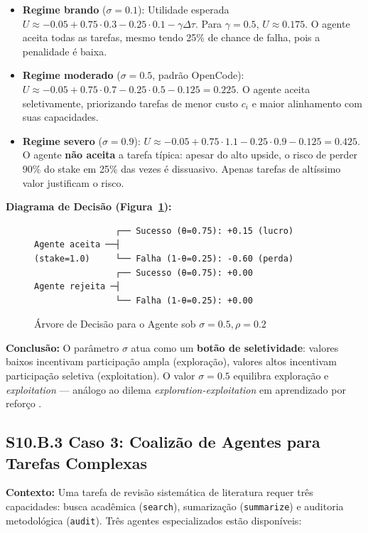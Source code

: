 \begin{itemize}
    \item \textbf{Regime brando} ($\sigma = 0.1$): Utilidade esperada $U \approx -0.05 + 0.75 \cdot 0.3 - 0.25 \cdot 0.1 - \gamma\Delta\tau$. Para $\gamma=0.5$, $U \approx 0.175$. O agente aceita todas as tarefas, mesmo tendo 25\% de chance de falha, pois a penalidade é baixa.
    
    \item \textbf{Regime moderado} ($\sigma = 0.5$, padrão OpenCode): $U \approx -0.05 + 0.75 \cdot 0.7 - 0.25 \cdot 0.5 - 0.125 = 0.225$. O agente aceita seletivamente, priorizando tarefas de menor custo $c_i$ e maior alinhamento com suas capacidades.
    
    \item \textbf{Regime severo} ($\sigma = 0.9$): $U \approx -0.05 + 0.75 \cdot 1.1 - 0.25 \cdot 0.9 - 0.125 = 0.425$. O agente \textbf{não aceita} a tarefa típica: apesar do alto upside, o risco de perder 90\% do stake em 25\% das vezes é dissuasivo. Apenas tarefas de altíssimo valor justificam o risco.
\end{itemize}

\textbf{Diagrama de Decisão (Figura~\ref{fig:decision_tree}):}
\begin{figure}[htbp]
\centering
\begin{verbatim}
                ┌── Sucesso (θ=0.75): +0.15 (lucro)
Agente aceita ──┤
(stake=1.0)     └── Falha (1-θ=0.25): -0.60 (perda)
                ┌── Sucesso (θ=0.75): +0.00
Agente rejeita ─┤
                └── Falha (1-θ=0.25): +0.00
\end{verbatim}
\caption{Árvore de Decisão para o Agente sob $\sigma=0.5, \rho=0.2$}
\label{fig:decision_tree}
\end{figure}

\textbf{Conclusão:} O parâmetro $\sigma$ atua como um \textbf{botão de seletividade}: valores baixos incentivam participação ampla (exploração), valores altos incentivam participação seletiva (exploitation). O valor $\sigma = 0.5$ equilibra exploração e \textit{exploitation} --- análogo ao dilema \textit{exploration-exploitation} em aprendizado por reforço \cite{sutton2018reinforcement}.

\subsection*{S10.B.3 Caso 3: Coalizão de Agentes para Tarefas Complexas}

\textbf{Contexto:} Uma tarefa de revisão sistemática de literatura requer três capacidades: busca acadêmica (\texttt{search}), sumarização (\texttt{summarize}) e auditoria metodológica (\texttt{audit}). Três agentes especializados estão disponíveis:

